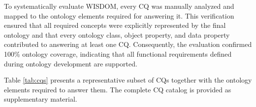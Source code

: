 \documentclass[
]{ceurart}
\begin{document}
To systematically evaluate WISDOM, every CQ was manually analyzed and mapped to the ontology elements required for answering it. This verification ensured that all required concepts were explicitly represented by the final ontology and that every ontology class, object property, and data property contributed to answering at least one CQ. Consequently, the evaluation confirmed 100\% ontology coverage, indicating that all functional requirements defined during ontology development are supported.

Table \ref{tab:cqs} presents a representative subset of CQs together with the ontology elements required to answer them. The complete CQ catalog is provided as supplementary material.

\end{document}
